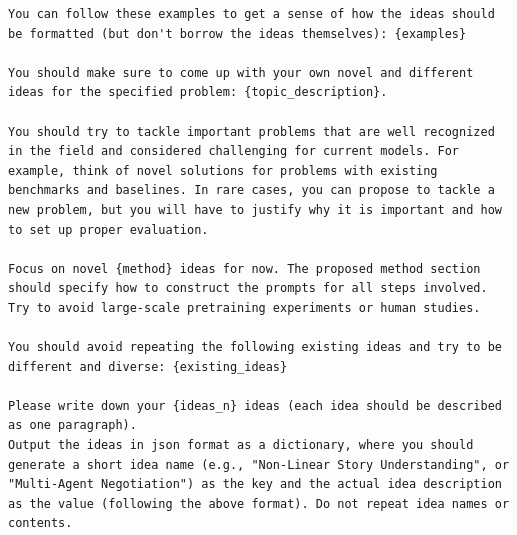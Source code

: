 {\begin{tcolorbox}[
    colframe=black!50!white, 
    colback=black!10!white, 
    title=Initial Idea Generation Prompt, 
    width=0.95\textwidth,
    boxsep=3pt
]
\begin{Verbatim}[breaklines, breakanywhere=true, obeytabs=true]
You can follow these examples to get a sense of how the ideas should be formatted (but don't borrow the ideas themselves): {examples}

You should make sure to come up with your own novel and different ideas for the specified problem: {topic_description}. 

You should try to tackle important problems that are well recognized in the field and considered challenging for current models. For example, think of novel solutions for problems with existing benchmarks and baselines. In rare cases, you can propose to tackle a new problem, but you will have to justify why it is important and how to set up proper evaluation. 

Focus on novel {method} ideas for now. The proposed method section should specify how to construct the prompts for all steps involved. Try to avoid large-scale pretraining experiments or human studies.

You should avoid repeating the following existing ideas and try to be different and diverse: {existing_ideas}

Please write down your {ideas_n} ideas (each idea should be described as one paragraph). 
Output the ideas in json format as a dictionary, where you should generate a short idea name (e.g., "Non-Linear Story Understanding", or "Multi-Agent Negotiation") as the key and the actual idea description as the value (following the above format). Do not repeat idea names or contents.
\end{Verbatim}
\end{tcolorbox}
\par}
\newpage


